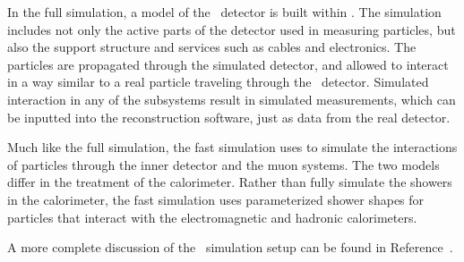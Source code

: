 In the full simulation, a model of the \ATLAS\ detector is built within .
The simulation includes not only the active parts of the detector used in
measuring particles, but also the support structure and services such as cables
and electronics.
The particles are propagated through the simulated detector, and allowed to
interact in a way similar to a real particle traveling through the
\atlas\ detector.
Simulated interaction in any of the subsystems result in simulated
measurements, which can be inputted into the reconstruction software, just as
data from the real detector.

Much like the full simulation, the fast simulation uses  to simulate the
interactions of particles through the inner detector and the muon systems.
The two models differ in the treatment of the calorimeter.
Rather than fully simulate the showers in the calorimeter, the fast simulation
uses parameterized shower shapes for particles that interact with the
electromagnetic and hadronic calorimeters.

A more complete discussion of the \atlas\ simulation setup can be found
in Reference~\cite{ATLASSimulation}.

